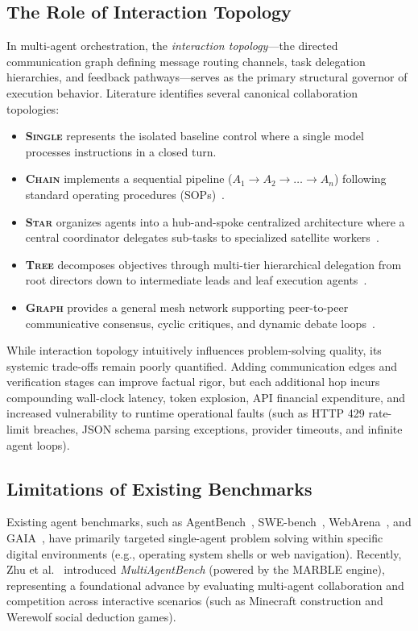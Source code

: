 \subsection{The Role of Interaction Topology}
In multi-agent orchestration, the \textit{interaction topology}---the directed communication graph defining message routing channels, task delegation hierarchies, and feedback pathways---serves as the primary structural governor of execution behavior. Literature identifies several canonical collaboration topologies:
\begin{itemize}
    \item \textbf{\textsc{Single}} represents the isolated baseline control where a single model processes instructions in a closed turn.
    \item \textbf{\textsc{Chain}} implements a sequential pipeline ($A_1 \rightarrow A_2 \rightarrow \dots \rightarrow A_n$) following standard operating procedures (SOPs)~\cite{Hong2024MetaGPT}.
    \item \textbf{\textsc{Star}} organizes agents into a hub-and-spoke centralized architecture where a central coordinator delegates sub-tasks to specialized satellite workers~\cite{Wu2024AutoGen}.
    \item \textbf{\textsc{Tree}} decomposes objectives through multi-tier hierarchical delegation from root directors down to intermediate leads and leaf execution agents~\cite{Chen2024AgentVerse,Zhu2025MultiAgentBench}.
    \item \textbf{\textsc{Graph}} provides a general mesh network supporting peer-to-peer communicative consensus, cyclic critiques, and dynamic debate loops~\cite{Du2024Improving,Zhu2025MultiAgentBench}.
\end{itemize}

While interaction topology intuitively influences problem-solving quality, its systemic trade-offs remain poorly quantified. Adding communication edges and verification stages can improve factual rigor, but each additional hop incurs compounding wall-clock latency, token explosion, API financial expenditure, and increased vulnerability to runtime operational faults (such as HTTP 429 rate-limit breaches, JSON schema parsing exceptions, provider timeouts, and infinite agent loops).

\subsection{Limitations of Existing Benchmarks}
Existing agent benchmarks, such as AgentBench~\cite{Liu2024AgentBench}, SWE-bench~\cite{Jimenez2024SWEbench}, WebArena~\cite{Zhou2024WebArena}, and GAIA~\cite{Mialon2024GAIA}, have primarily targeted single-agent problem solving within specific digital environments (e.g., operating system shells or web navigation). Recently, Zhu et al.~\cite{Zhu2025MultiAgentBench} introduced \textit{MultiAgentBench} (powered by the MARBLE engine), representing a foundational advance by evaluating multi-agent collaboration and competition across interactive scenarios (such as Minecraft construction and Werewolf social deduction games).

